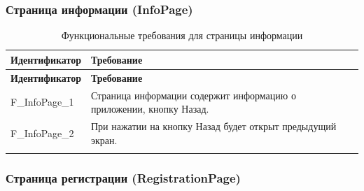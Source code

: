 \documentclass[a4paper, 14pt]{article}
\begin{document}
\subsubsection{Страница информации (InfoPage)}

\begin{longtable}{| p{} | p{} |}
    \hline
    \textbf{Идентификатор}          & \textbf{Требование}                                                                                                                                                                \\
    \hline
    \endfirsthead
    \hline
    \textbf{Идентификатор}          & \textbf{Требование}                                                                                                                                                                \\
    \hline
    \endhead

    F\_InfoPage\_1                  & Страница информации содержит информацию о приложении, кнопку Назад.                                                                                                                \\ \hline
    F\_InfoPage\_2                  & При нажатии на кнопку Назад будет открыт предыдущий экран.                                                                                                                         \\ \hline

    \caption{Функциональные требования для страницы информации}
\end{longtable}

\subsubsection{Страница регистрации (RegistrationPage)}
\end{document}
